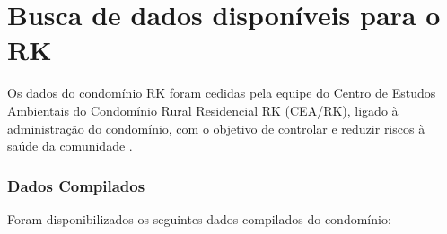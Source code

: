 



\section{Busca de dados disponíveis para o RK}

Os dados do condomínio RK foram cedidas pela equipe do Centro de Estudos Ambientais do Condomínio Rural Residencial RK (CEA/RK), ligado à administração do condomínio, com o objetivo de controlar e reduzir riscos à saúde da comunidade \cite{CondominioRK:online}. 

\subsubsection{Dados Compilados}


Foram disponibilizados os seguintes dados compilados do condomínio:


